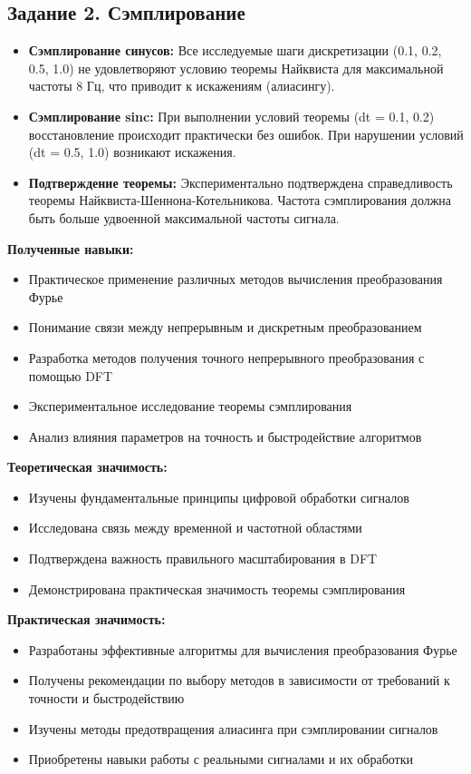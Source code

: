 \subsection*{Задание 2. Сэмплирование}
\begin{itemize}
    \item \textbf{Сэмплирование синусов:} Все исследуемые шаги дискретизации (0.1, 0.2, 0.5, 1.0) не удовлетворяют условию теоремы Найквиста для максимальной частоты 8 Гц, что приводит к искажениям (алиасингу).
    
    \item \textbf{Сэмплирование sinc:} При выполнении условий теоремы (dt = 0.1, 0.2) восстановление происходит практически без ошибок. При нарушении условий (dt = 0.5, 1.0) возникают искажения.
    
    \item \textbf{Подтверждение теоремы:} Экспериментально подтверждена справедливость теоремы Найквиста-Шеннона-Котельникова. Частота сэмплирования должна быть больше удвоенной максимальной частоты сигнала.
\end{itemize}

\textbf{Полученные навыки:}
\begin{itemize}
    \item Практическое применение различных методов вычисления преобразования Фурье
    \item Понимание связи между непрерывным и дискретным преобразованием
    \item Разработка методов получения точного непрерывного преобразования с помощью DFT
    \item Экспериментальное исследование теоремы сэмплирования
    \item Анализ влияния параметров на точность и быстродействие алгоритмов
\end{itemize}

\textbf{Теоретическая значимость:}
\begin{itemize}
    \item Изучены фундаментальные принципы цифровой обработки сигналов
    \item Исследована связь между временной и частотной областями
    \item Подтверждена важность правильного масштабирования в DFT
    \item Демонстрирована практическая значимость теоремы сэмплирования
\end{itemize}

\textbf{Практическая значимость:}
\begin{itemize}
    \item Разработаны эффективные алгоритмы для вычисления преобразования Фурье
    \item Получены рекомендации по выбору методов в зависимости от требований к точности и быстродействию
    \item Изучены методы предотвращения алиасинга при сэмплировании сигналов
    \item Приобретены навыки работы с реальными сигналами и их обработки
\end{itemize}